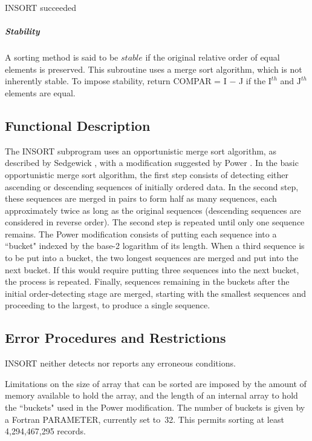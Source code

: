 \documentclass[twoside]{MATH77}
\begin{document}
\hspace{.2in}INSORT succeeded

\subparagraph{Stability}

A sorting method is said to be $stable$ if the original relative order of
equal elements is preserved. This subroutine uses a  merge sort algorithm,
which is not inherently stable. To impose stability, return COMPAR =
I $-$ J if the $\text{I}%
^{th}$ and $\text{J}^{th}$ elements are equal.

\subsection{Functional Description}

The INSORT subprogram uses an opportunistic merge sort algorithm, as
described by Sedgewick \cite{Sedgewick:1983:A}, with a modification
suggested by Power \cite{Power:1980:ISU}.  In the basic opportunistic
merge sort algorithm, the first step consists of detecting either
ascending or descending sequences of initially ordered data.  In the
second step, these sequences are merged in pairs to form half as many
sequences, each approximately twice as long as the original sequences
(descending sequences are considered in reverse order).  The second step
is repeated until only one sequence remains.  The Power modification
consists of putting each sequence into a ``bucket" indexed by the base-2
logarithm of its length.  When a third sequence is to be put into a
bucket, the two longest sequences are merged and put into the next bucket.
If this would require putting three sequences into the next bucket, the
process is repeated.  Finally, sequences remaining in the buckets after
the initial order-detecting stage are merged, starting with the smallest
sequences and proceeding to the largest, to produce a single sequence.




\subsection{Error Procedures and Restrictions}

INSORT neither detects nor reports any erroneous conditions.

Limitations on the size of array that can be sorted are imposed by the
amount of memory available to hold the array, and the length of an internal
array to hold the ``buckets" used in the Power modification. The number of
buckets is given by a Fortran PARAMETER, currently set to~32. This permits
sorting at least 4,294,467,295 records.
\end{document}
